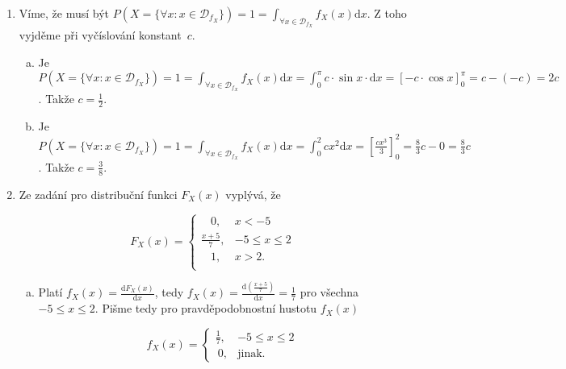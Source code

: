 ﻿\documentclass{article}
\begin{document}
\begin{enumerate}[1)]
\begin{enumerate}[a)]
\end{enumerate}

\item Víme, že musí být $P(X = \{\forall x: x \in \mathcal{D}_{f_{X}}\}) = 1 = \int_{\forall x \in \mathcal{D}_{f_{X}}} f_{X}(x) \text{d}x$. Z toho vyjděme při vyčíslování \mbox{konstant $c$}.

\begin{enumerate}[a)]

\item Je $P(X = \{\forall x: x \in \mathcal{D}_{f_{X}}\}) = 1 = \int_{\forall x \in \mathcal{D}_{f_{X}}} f_{X}(x) \text{d}x = \int_{0}^{\pi} c \cdot \sin x \cdot \text{d}x = \left[ -c \cdot \cos x \right]_{0}^{\pi} = c - (-c) = 2c$. Takže $c = \frac{1}{2}$.

\item Je $P(X = \{\forall x: x \in \mathcal{D}_{f_{X}}\}) = 1 = \int_{\forall x \in \mathcal{D}_{f_{X}}} f_{X}(x) \text{d}x = \int_{0}^{2} c x^{2} \text{d}x = \left[ \frac{cx^{3}}{3} \right]_{0}^{2} = \frac{8}{3}c - 0 = \frac{8}{3}c$. Takže $c = \frac{3}{8}$.

\end{enumerate}

\item Ze zadání pro distribuční funkci $F_{X}(x)$ vyplývá, že

\begin{equation*}
F_{X}(x) = \left\{
\begin{array}{ll}
\phantom{ \ \ \ \ }0, & x < -5 \\
\frac{x + 5}{7}, & -5 \leq x \leq 2 \\
\phantom{ \ \ \ \ }1, & x > 2 .\\
\end{array} \right.
\end{equation*}

\begin{enumerate}[a)]

\item Platí $f_{X}(x) = \frac{\text{d} F_{X}(x)}{\text{d}x}$, tedy $f_{X}(x) = \frac{\text{d} \left(\frac{x + 5}{7}\right)}{\text{d}x} = \frac{1}{7}$ pro všechna $-5 \leq x \leq 2$. Pišme tedy pro pravděpodobnostní hustotu $f_{X}(x)$

\begin{equation*}
f_{X}(x) = \left\{
\begin{array}{ll}
\frac{1}{7}, & -5 \leq x \leq 2 \\
\phantom{ \ }0, & \text{jinak}.
\end{array} \right.
\end{equation*}


\end{enumerate}
\end{enumerate}
\end{document}
